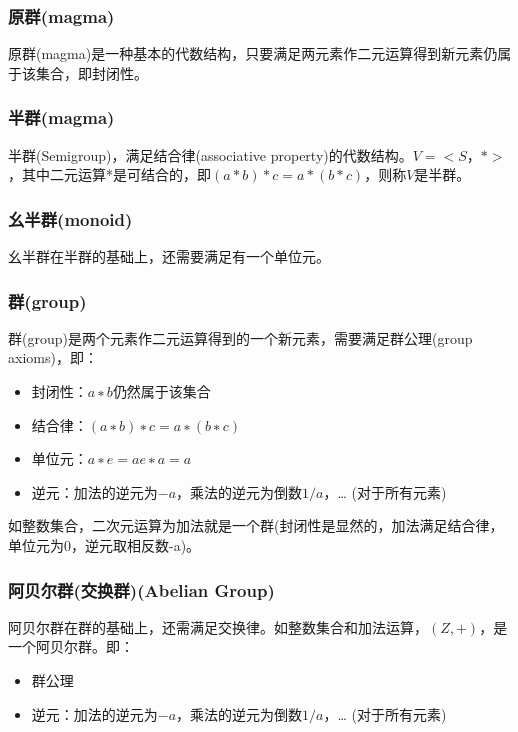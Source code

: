 \documentclass[12pt]{article}
\begin{document}
\subsubsection{原群(magma)}
原群(magma)是一种基本的代数结构，只要满足两元素作二元运算得到新元素仍属于该集合，即封闭性。

\subsubsection{半群(magma)}
半群(Semigroup)，满足结合律(associative property)的代数结构。$V=<S，* >$，其中二元运算*是可结合的，即$(a*b)*c=a*(b*c)$，则称$V$是半群。

\subsubsection{幺半群(monoid)}
幺半群在半群的基础上，还需要满足有一个单位元。

\subsubsection{群(group)}
群(group)是两个元素作二元运算得到的一个新元素，需要满足群公理(group axioms)，即：
\begin{itemize}
\setlength{\itemsep}{0pt}
\setlength{\parsep}{0pt}
\setlength{\parskip}{0pt}
\item 封闭性：$a ∗ b$仍然属于该集合
\item 结合律：$(a ∗ b) ∗ c = a ∗ (b ∗ c)$
\item 单位元：$a ∗ e = a  e ∗ a = a$
\item 逆元：加法的逆元为$-a$，乘法的逆元为倒数$1/a$，… (对于所有元素)
\end{itemize}

如整数集合，二次元运算为加法就是一个群(封闭性是显然的，加法满足结合律，单位元为0，逆元取相反数-a)。

\subsubsection{阿贝尔群(交换群)(Abelian Group)}
阿贝尔群在群的基础上，还需满足交换律。如整数集合和加法运算，$(Z,+)$，是一个阿贝尔群。即：
\begin{itemize}
\setlength{\itemsep}{0pt}
\setlength{\parsep}{0pt}
\setlength{\parskip}{0pt}
\item 群公理
\item 逆元：加法的逆元为$-a$，乘法的逆元为倒数$1/a$，… (对于所有元素)
\end{itemize}
\end{document}
